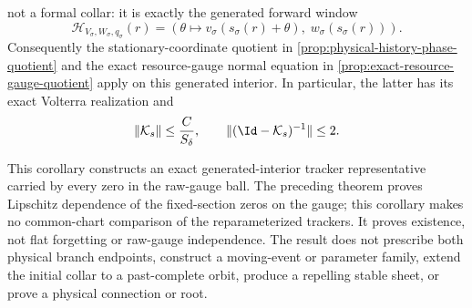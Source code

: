 \begin{corollary}
not a formal collar: it is exactly the generated forward window
\begin{equation}
 \mathcal H_{V_\sigma,W_\sigma,q_\sigma}(r)
 =\left(
   \theta\longmapsto v_\sigma(s_\sigma(r)+\theta),\;
   w_\sigma(s_\sigma(r))
   \right).                                      \label{eq:generated-interior-history-window}
\end{equation}
Consequently the stationary-coordinate quotient in
\cref{prop:physical-history-phase-quotient} and the exact resource-gauge
normal equation in \cref{prop:exact-resource-gauge-quotient} apply on this
generated interior.  In particular, the latter has its exact Volterra
realization and
\begin{equation}
 \|\mathcal K_s\|\le \frac{C}{S_\delta},\qquad
 \|(\Id-\mathcal K_s)^{-1}\|\le2.                \label{eq:generated-interior-volterra-bound}
\end{equation}

This corollary constructs an exact generated-interior tracker
representative carried by every zero in the raw-gauge ball.  The preceding
theorem proves Lipschitz dependence of the fixed-section zeros on the gauge;
this corollary makes no common-chart comparison of the reparameterized
trackers.  It proves existence, not flat forgetting or raw-gauge independence.
The result does not prescribe both physical branch endpoints,
construct a moving-event or parameter family, extend the initial collar to
a past-complete orbit, produce a repelling stable sheet, or prove a physical
connection or root.
\end{corollary}

